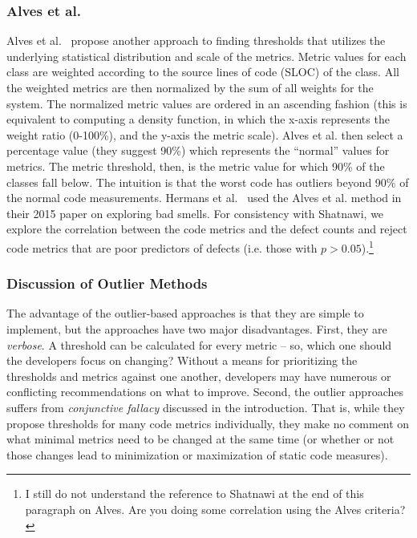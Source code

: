 \documentclass[twocolumn,5p]{elsarticle}
\theoremstyle{break}
\begin{document}
	
	\subsubsection{ Alves et al.}
	Alves et al.~\cite{Alves2010} propose another approach 
	to finding thresholds that  utilizes the underlying statistical distribution and scale of the metrics. 
	Metric values for each class are weighted according to the source lines of code (SLOC) of the class. All the weighted metrics are then normalized by the sum of all weights for the system. 
	The normalized metric values are ordered in an ascending fashion (this is equivalent to computing a density function, in which the x-axis represents the weight ratio (0-100\%), and the y-axis the metric scale).
	Alves et al. then select a percentage value (they suggest 90\%) which represents the ``normal'' values for metrics. The metric threshold, then, is the metric value for which 90\% of the classes fall below. The intuition  is that the worst code has outliers beyond 90\% of the normal code measurements. Hermans et al.~\cite{hermans15} used the
	Alves et al. method in their  2015 paper on
	exploring bad smells. For consistency with Shatnawi, we explore the correlation between the code metrics and the defect counts and  reject code metrics that are poor predictors of defects (i.e.   those  with $p > 0.05$).\footnote{I still do not understand the reference to Shatnawi at the end of this paragraph on Alves. Are you doing some correlation using the Alves criteria?}
	
	\subsubsection{Discussion of Outlier Methods}\label{sect:disc}
	The advantage of the outlier-based
	approaches is that they are simple to implement, but the approaches have   two  major disadvantages. 
	First, they are {\em verbose}. A threshold can be calculated for every metric -- so, which one should the developers focus on changing? Without a means for prioritizing the  thresholds and metrics against one another, developers may have numerous or conflicting recommendations on what to improve. Second, the outlier approaches suffers from {\em conjunctive fallacy}  discussed in the introduction. That is, while	they propose thresholds for many code metrics
	individually, they make no comment on what minimal metrics need to be changed at the same time (or whether or not those changes lead to minimization or maximization of static code measures).
	
\end{document}
